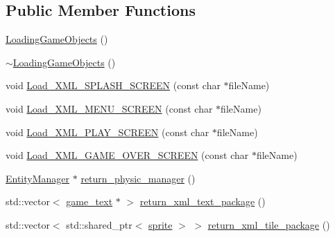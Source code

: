 \subsection*{Public Member Functions}
\begin{DoxyCompactItemize}
\item 
\hyperlink{classLoadingGameObjects_aed114905dd9c0a40377b914a69d5789f}{Loading\+Game\+Objects} ()
\item 
\hyperlink{classLoadingGameObjects_a0c9dbb7f52d5267822cee364ab1bed51}{$\sim$\+Loading\+Game\+Objects} ()
\item 
void \hyperlink{classLoadingGameObjects_a36afebb2ecefe6528452c20d7849d2e6}{Load\+\_\+\+X\+M\+L\+\_\+\+S\+P\+L\+A\+S\+H\+\_\+\+S\+C\+R\+E\+EN} (const char $\ast$file\+Name)
\item 
void \hyperlink{classLoadingGameObjects_ade2f03a6c289f88ea65e8147ffdc1583}{Load\+\_\+\+X\+M\+L\+\_\+\+M\+E\+N\+U\+\_\+\+S\+C\+R\+E\+EN} (const char $\ast$file\+Name)
\item 
void \hyperlink{classLoadingGameObjects_a565eacef28d8d57aa97ff0c7db24f2f9}{Load\+\_\+\+X\+M\+L\+\_\+\+P\+L\+A\+Y\+\_\+\+S\+C\+R\+E\+EN} (const char $\ast$file\+Name)
\item 
void \hyperlink{classLoadingGameObjects_ab3309caa91f6e18573a02e3e9275b64a}{Load\+\_\+\+X\+M\+L\+\_\+\+G\+A\+M\+E\+\_\+\+O\+V\+E\+R\+\_\+\+S\+C\+R\+E\+EN} (const char $\ast$file\+Name)
\item 
\hyperlink{classEntityManager}{Entity\+Manager} $\ast$ \hyperlink{classLoadingGameObjects_a673a83886fbad0d5d6b157552fe15a33}{return\+\_\+physic\+\_\+manager} ()
\item 
std\+::vector$<$ \hyperlink{classgame__text}{game\+\_\+text} $\ast$ $>$ \hyperlink{classLoadingGameObjects_a624442ce74962d9428fc281d0d422a54}{return\+\_\+xml\+\_\+text\+\_\+package} ()
\item 
std\+::vector$<$ std\+::shared\+\_\+ptr$<$ \hyperlink{classsprite}{sprite} $>$ $>$ \hyperlink{classLoadingGameObjects_af98b671e3ecc3f2cfd4307231f3771cf}{return\+\_\+xml\+\_\+tile\+\_\+package} ()
\end{DoxyCompactItemize}
